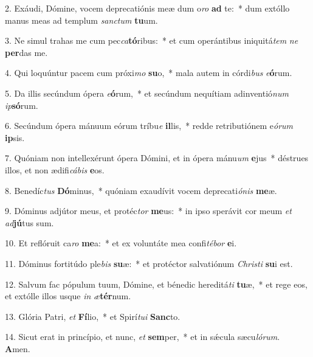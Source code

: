 2. Exáudi, Dómine, vocem deprecatiónis meæ dum o\textit{ro} \textbf{ad} te:~*  dum extóllo manus meas ad templum \textit{sanc}\textit{tum} \textbf{tu}um.\

3. Ne simul trahas me cum pec\textit{ca}\textbf{tó}ribus:~*  et cum operántibus iniquitá\textit{tem} \textit{ne} \textbf{per}das me.\

4. Qui loquúntur pacem cum próxi\textit{mo} \textbf{su}o,~*  mala autem in córdi\textit{bus} \textit{e}\textbf{ó}rum.\

5. Da illis secúndum ópera \textit{e}\textbf{ó}rum,~*  et secúndum nequítiam adinventió\textit{num} \textit{ip}\textbf{só}rum.\

6. Secúndum ópera mánuum eórum tríbu\textit{e} \textbf{il}lis,~*  redde retributiónem e\textit{ó}\textit{rum} \textbf{ip}sis.\

7. Quóniam non intellexérunt ópera Dómini, et in ópera mánu\textit{um} \textbf{e}jus~*  déstrues illos, et non ædifi\textit{cá}\textit{bis} \textbf{e}os.\

8. Benedíc\textit{tus} \textbf{Dó}minus,~*  quóniam exaudívit vocem deprecati\textit{ó}\textit{nis} \textbf{me}æ.\

9. Dóminus adjútor meus, et protéc\textit{tor} \textbf{me}us:~*  in ipso sperávit cor meum \textit{et} \textit{ad}\textbf{jú}tus sum.\

10. Et reflóruit ca\textit{ro} \textbf{me}a:~*  et ex voluntáte mea confi\textit{té}\textit{bor} \textbf{e}i.\

11. Dóminus fortitúdo ple\textit{bis} \textbf{su}æ:~*  et protéctor salvatiónum \textit{Chris}\textit{ti} \textbf{su}i est.\

12. Salvum fac pópulum tuum, Dómine, et bénedic hereditá\textit{ti} \textbf{tu}æ,~*  et rege eos, et extólle illos usque \textit{in} \textit{æ}\textbf{tér}num.\

13. Glória Patri, \textit{et} \textbf{Fí}lio,~*  et Spirí\textit{tu}\textit{i} \textbf{Sanc}to.\

14. Sicut erat in princípio, et nunc, \textit{et} \textbf{sem}per,~*  et in sǽcula sæcu\textit{ló}\textit{rum}. \textbf{A}men.\

